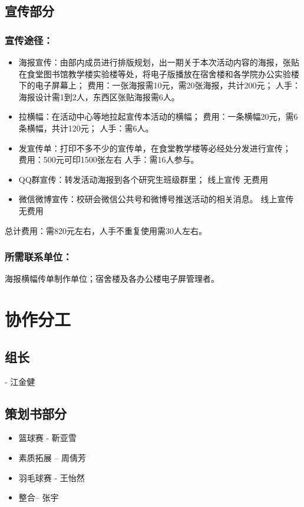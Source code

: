 \documentclass{article}
\begin{document}
\begin{CJK}{UTF8}{gbsn}
\begin{enumerate}
\end{enumerate}

\subsection{宣传部分}
\subsubsection{宣传途径：}
\begin{itemize}
	\item 海报宣传：由部内成员进行排版规划，出一期关于本次活动内容的海报，张贴在食堂图书馆教学楼实验楼等处，将电子版播放在宿舍楼和各学院办公实验楼下的电子屏幕上；
	费用：一张海报需10元，需20张海报，共计200元；
	人手：海报设计需1到2人，东西区张贴海报需6人。
	\item 拉横幅：在活动中心等地拉起宣传本活动的横幅；
	费用：一条横幅20元，需6条横幅，共计120元；
	人手：需6人。
	\item 发宣传单：打印不多不少的宣传单，在食堂教学楼等必经处分发进行宣传；
	费用：500元可印1500张左右
	人手：需16人参与。
	\item QQ群宣传：转发活动海报到各个研究生班级群里；
	线上宣传 无费用
	\item 微信微博宣传：校研会微信公共号和微博号推送活动的相关消息。
	线上宣传 无费用 
\end{itemize}

总计费用：需820元左右，人手不重复使用需30人左右。

\subsubsection{所需联系单位：}海报横幅传单制作单位；宿舍楼及各办公楼电子屏管理者。

\newpage
\section{协作分工}
\subsection{组长}
- 江金健
\subsection{策划书部分}
\begin{itemize}
	\item 篮球赛 - 靳亚雪
	\item 素质拓展 – 周倩芳
	\item 羽毛球赛 - 王怡然
	\item 整合– 张宇
\end{itemize}

\end{CJK}
\end{document}
